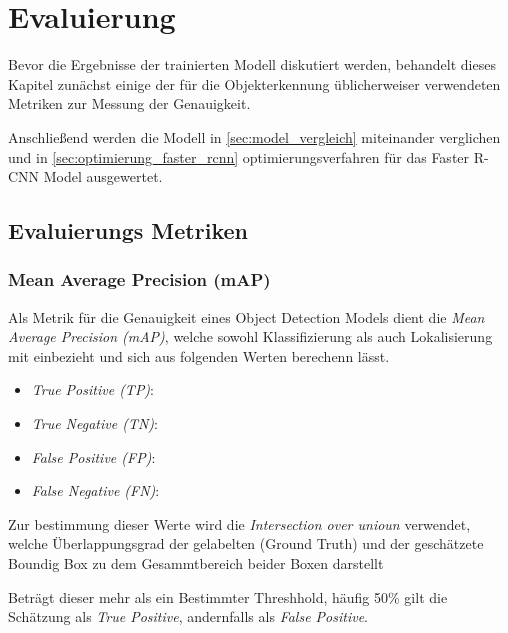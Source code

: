 \chapter{Evaluierung}\label{kap:eval}

Bevor die Ergebnisse der trainierten Modell diskutiert 
werden, behandelt dieses Kapitel zunächst einige der für die 
Objekterkennung üblicherweiser verwendeten Metriken zur Messung
der Genauigkeit. 


Anschließend werden die Modell in \ref{sec:model_vergleich}
miteinander verglichen und in \ref{sec:optimierung_faster_rcnn}
optimierungsverfahren für das Faster R-CNN Model ausgewertet.


\section{Evaluierungs Metriken}\label{sec:metricen}

\subsection*{Mean Average Precision (mAP)}

Als Metrik für die Genauigkeit eines Object Detection Models 
dient die \textit{Mean Average Precision (mAP)}, welche 
sowohl Klassifizierung als auch Lokalisierung mit einbezieht 
und sich aus folgenden Werten berechenn lässt.


\begin{itemize}
  \item \textit{True Positive (TP)}: 
  \item \textit{True Negative (TN)}: 
  \item \textit{False Positive (FP)}: 
  \item \textit{False Negative (FN)}: 
\end{itemize}

Zur bestimmung dieser Werte wird die \textit{Intersection over unioun}
verwendet, welche Überlappungsgrad der gelabelten (Ground Truth) und der
geschätzete Boundig Box zu dem Gesammtbereich beider Boxen darstellt 

Beträgt dieser mehr als ein Bestimmter Threshhold, häufig 50\%
gilt die Schätzung als \textit{True Positive}, andernfalls als 
\textit{False Positive}. 


\newcommand\MyBox[2]{
  \fbox{\lower0.75cm
    \vbox to 1.7cm{\vfil
      \hbox to 1.7cm{\hfil\parbox{1.4cm}{#1\\#2}\hfil}
      \vfil}%
  }%
}
\noindent
\renewcommand\arraystretch{1.5}
\setlength\tabcolsep{0pt}

